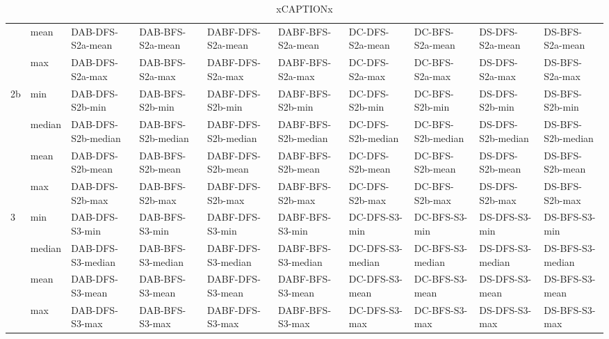 \begin{table}
\begin{tabular}{|l|l|l|l|l|l|l|l|l|l|}
                    & mean   & DAB-DFS-S2a-mean   & DAB-BFS-S2a-mean   & DABF-DFS-S2a-mean   & DABF-BFS-S2a-mean   & DC-DFS-S2a-mean          & DC-BFS-S2a-mean          & DS-DFS-S2a-mean          & DS-BFS-S2a-mean           \\
                    & max    & DAB-DFS-S2a-max    & DAB-BFS-S2a-max    & DABF-DFS-S2a-max    & DABF-BFS-S2a-max    & DC-DFS-S2a-max           & DC-BFS-S2a-max           & DS-DFS-S2a-max           & DS-BFS-S2a-max            \\
\hline
\multirow{4}{*}{2b} & min    & DAB-DFS-S2b-min    & DAB-BFS-S2b-min    & DABF-DFS-S2b-min    & DABF-BFS-S2b-min    & DC-DFS-S2b-min           & DC-BFS-S2b-min           & DS-DFS-S2b-min           & DS-BFS-S2b-min            \\
                    & median & DAB-DFS-S2b-median & DAB-BFS-S2b-median & DABF-DFS-S2b-median & DABF-BFS-S2b-median & DC-DFS-S2b-median        & DC-BFS-S2b-median        & DS-DFS-S2b-median        & DS-BFS-S2b-median         \\
                    & mean   & DAB-DFS-S2b-mean   & DAB-BFS-S2b-mean   & DABF-DFS-S2b-mean   & DABF-BFS-S2b-mean   & DC-DFS-S2b-mean          & DC-BFS-S2b-mean          & DS-DFS-S2b-mean          & DS-BFS-S2b-mean           \\
                    & max    & DAB-DFS-S2b-max    & DAB-BFS-S2b-max    & DABF-DFS-S2b-max    & DABF-BFS-S2b-max    & DC-DFS-S2b-max           & DC-BFS-S2b-max           & DS-DFS-S2b-max           & DS-BFS-S2b-max            \\
\hline
\multirow{4}{*}{3}  & min    & DAB-DFS-S3-min     & DAB-BFS-S3-min     & DABF-DFS-S3-min     & DABF-BFS-S3-min     & DC-DFS-S3-min            & DC-BFS-S3-min            & DS-DFS-S3-min            & DS-BFS-S3-min             \\
                    & median & DAB-DFS-S3-median  & DAB-BFS-S3-median  & DABF-DFS-S3-median  & DABF-BFS-S3-median  & DC-DFS-S3-median         & DC-BFS-S3-median         & DS-DFS-S3-median         & DS-BFS-S3-median          \\
                    & mean   & DAB-DFS-S3-mean    & DAB-BFS-S3-mean    & DABF-DFS-S3-mean    & DABF-BFS-S3-mean    & DC-DFS-S3-mean           & DC-BFS-S3-mean           & DS-DFS-S3-mean           & DS-BFS-S3-mean            \\
                    & max    & DAB-DFS-S3-max     & DAB-BFS-S3-max     & DABF-DFS-S3-max     & DABF-BFS-S3-max     & DC-DFS-S3-max            & DC-BFS-S3-max            & DS-DFS-S3-max            & DS-BFS-S3-max             \\
\hline
\end{tabular}
\caption{xCAPTIONx}
\end{table}